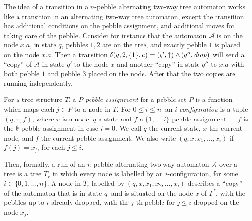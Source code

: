 \documentclass[a4paper,UKenglish,cleveref, autoref, thm-restate]{lipics-v2021}
\begin{document}
 
The idea of a transition in a $n$-pebble alternating two-way tree automaton works like a transition in an alternating two-way tree automaton,
except the transition has additional conditions on the pebble assignment, and additional moves for taking care of the pebble.
Consider for instance 
that the automaton
 $\mathcal{A}$ is on the node $x.a$, in state $q$, pebbles $1, 2$ are on the tree, and exactly pebble $1$ is placed on the node $x.a$.
Then a transition
$\delta(q, 2, \{ 1\}, a) =  (q',\uparrow) \wedge (q'',\text{\textit{drop}})$
 will send a “copy” of $\mathcal{A}$  in state $q'$ to the node $x$ and
another “copy” in state $q''$ to $x.a$ with both pebble $1$ and pebble $3$ placed on the node. 
After that the two copies are
running independently.






For a tree structure $T$, a 
{\em $P$-pebble assignment} for a pebble set $P$ is a function which maps each $j \in P$ to a node in $T$.
For $0 \leq i \leq n$, an {\em $i$-configuration} is a tuple $(q, x, f )$, where $x$ is a node, $q$ a state and
$f$ a $\{ 1, \ldots , i \}$-pebble assignment \---- $f$ is the $\emptyset$-pebble assignment in case $i=0$. 
We call $q$ the current state, $x$ the current node, and
$f$ the current pebble assignment. 
We also write $(q, x, x_{1} , \ldots , x_{i} )$ if 
$f(j) = x_j$, for each
$j \leq i$.






Then, formally, a run of an $n$-pebble alternating two-way automaton $\mathcal{A}$
over a tree is a tree $T_r$ in which every node is labelled by 
an $i$-configuration,
for some $i \in \{0, 1, \ldots, n\}$. A node in $T_r$ labelled by $(q, x, x_{1}, x_{2}, \ldots, x_{i})$ describes a “copy” of the automaton that is in state $q$, and is situated on the node $x$ of $\Gamma^*$, with the pebbles up to $i$ already dropped, with the $j$-th pebble for $j \leq i$ dropped on the node $x_{j}$.
\end{document}
